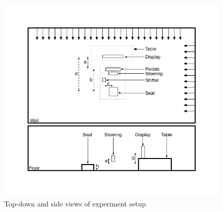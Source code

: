 \begin{figure}
	\centering
	\includegraphics[width=\textwidth]{images/experiment-setup-schematic.png}
	\caption[Experiment Setup Schematic]{Top-down and side views of experiment setup}
	\label{fig:meth-experiment-setup}
\end{figure}

